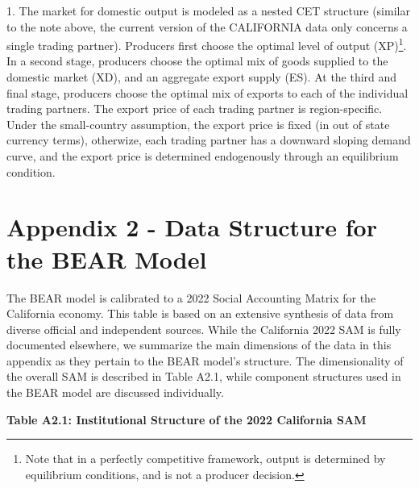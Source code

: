 \documentclass[12pt]{article}
\begin{document}
\begin{footnotesize}
1. \hspace{10pt} The market for domestic output is modeled as a nested CET structure (similar to the note above, the current version of the CALIFORNIA data only concerns a single trading partner). Producers first choose the optimal level of output (XP)\footnote{Note that in a perfectly competitive framework, output is determined by equilibrium conditions, and is not a producer decision.}. In a second stage, producers choose the optimal mix of goods supplied to the domestic market (XD), and an aggregate export supply (ES). At the third and final stage, producers choose the optimal mix of exports to each of the individual trading partners. The export price of each trading partner is region-specific. Under the small-country assumption, the export price is fixed (in out of state currency terms), otherwize, each trading partner has a downward sloping demand curve, and the export price is determined endogenously through an equilibrium condition.


\end{footnotesize}

\newpage
\section*{Appendix 2 - Data Structure for the BEAR Model}

The BEAR model is calibrated to a 2022 Social Accounting Matrix for the California economy. This table is based on an extensive synthesis of data from diverse official and independent sources. While the California 2022 SAM is fully documented elsewhere, we summarize the main dimensions of the data in this appendix as they pertain to the BEAR model's structure. The dimensionality of the overall SAM is described in Table A2.1, while component structures used in the BEAR model are discussed individually.

\textbf{Table A2.1: Institutional Structure of the 2022 California SAM}
\end{document}
